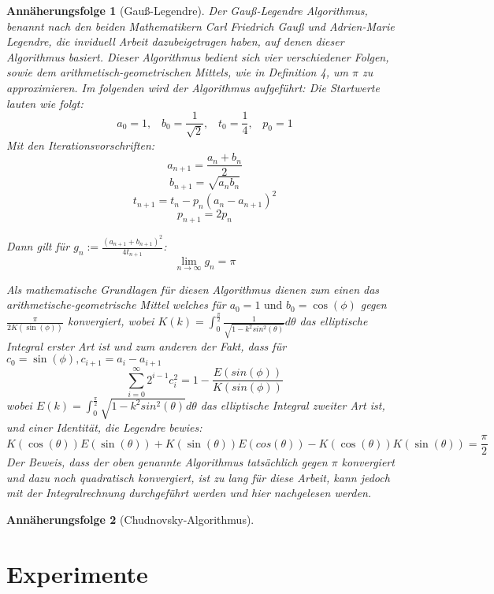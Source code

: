 \documentclass{scrartcl}
\newtheorem{approximation sequence}{Annäherungsfolge}
\begin{document}
\begin{approximation sequence}[Gauß-Legendre]
Der Gauß-Legendre Algorithmus, benannt nach den beiden Mathematikern Carl Friedrich Gauß 
und Adrien-Marie Legendre, die inviduell Arbeit dazubeigetragen haben, auf denen dieser Algorithmus basiert.
Dieser Algorithmus bedient sich vier verschiedener Folgen, sowie dem arithmetisch-geometrischen Mittels, 
wie in Definition 4, um \(\pi\) zu approximieren.
Im folgenden wird der Algorithmus aufgeführt: \cite{AGM-Gauß-Legendre}
Die Startwerte lauten wie folgt:
\[a_0 = 1, \;\;\; b_0 = \frac{1}{\sqrt{2}}, \;\;\; t_0 = \frac{1}{4}, \;\;\; p_0 = 1 \]
Mit den Iterationsvorschriften:
\[a_{n+1} = \frac{a_n + b_n}{2} \] 
\[b_{n+1} = \sqrt{a_nb_n} \]
\[t_{n+1} = t_n - p_n(a_n - a_{n+1})^2 \]
\[p_{n+1} = 2p_n \] 

Dann gilt für \(g_n := \frac{(a_{n+1} + b_{n+1})^2}{4t_{n+1}}\):
\[\lim_{n \to \infty}g_n = \pi \] \cite{AGM-Gauß-Legendre}

Als mathematische Grundlagen \cite{Eugene-Salamin} für diesen Algorithmus dienen zum einen das arithmetische-geometrische Mittel welches 
für \(a_0 = 1 \text{ und } b_0 = \cos(\phi)\) gegen \(\frac{\pi}{2K(\sin(\phi))}\) konvergiert, wobei
\(K(k) = \int_{0}^{\frac{\pi}{2}} \frac{1}{\sqrt{1-k^2sin^2(\theta)}}d\theta \) das elliptische Integral erster Art ist und zum anderen
der Fakt, dass für \(c_0 = \sin(\phi), c_{i+1} = a_i - a_{i+1}\)
\[ \sum_{i= 0}^{\infty} 2^{i-1} c_{i}^{2} = 1 - \frac{E(sin(\phi))}{K(sin(\phi))} \]
wobei \(E(k) = \int_{0}^{\frac{\pi}{2}}\sqrt{1-k^2sin^2(\theta)}d\theta\) das elliptische Integral zweiter Art ist,
und einer Identität, die Legendre bewies:
\[K(\cos(\theta))E(\sin(\theta)) + K(\sin(\theta))E(cos(\theta)) - K(\cos(\theta))K(\sin(\theta)) = \frac{\pi}{2} \] 
Der Beweis, dass der oben genannte Algorithmus tatsächlich gegen \(\pi\) konvergiert und dazu noch quadratisch konvergiert, ist zu lang 
für diese Arbeit, kann jedoch mit der Integralrechnung durchgeführt werden und hier \cite{Gauß-Legendre} nachgelesen werden. 
\end{approximation sequence}


\begin{approximation sequence}[Chudnovsky-Algorithmus]

\end{approximation sequence}

\section{Experimente}
\end{document}
